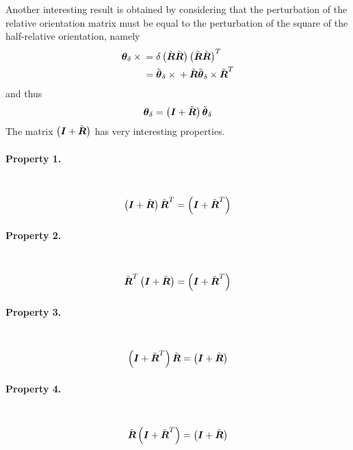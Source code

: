 \documentclass[10pt,dvips,fleqn]{report}
\newcommand{\T}[1]{\boldsymbol{#1}}
\begin{document}
Another interesting result is obtained by considering that
the perturbation of the relative orientation matrix
must be equal to the perturbation of the square 
of the half-relative orientation, namely
\begin{align}
	\T{\theta}_{\delta} \times{}
	&= \delta\plbr{\tilde{\T{R}}\tilde{\T{R}}} \plbr{\tilde{\T{R}}\tilde{\T{R}}}^T \\
	&= \tilde{\T{\theta}}_{\delta} \times{} + \tilde{\T{R}} \tilde{\T{\theta}}_{\delta} \times \tilde{\T{R}}^T
\end{align}
and thus
\begin{equation}
	\T{\theta}_{\delta} = \plbr{\T{I} + \tilde{\T{R}}} \tilde{\T{\theta}}_{\delta}
	\label{eq:inv-def-h-theta-delta-tilde}
\end{equation}
The matrix $\plbr{\T{I} + \tilde{\T{R}}}$ has very interesting properties.

\paragraph{Property 1.} \
\begin{equation}
	\plbr{\T{I} + \tilde{\T{R}}} \tilde{\T{R}}^T = \plbr{\T{I} + \tilde{\T{R}}^T}
	\label{eq:inv-def-h-property-1}
\end{equation}

\paragraph{Property 2.} \
\begin{equation}
	\tilde{\T{R}}^T \plbr{\T{I} + \tilde{\T{R}}} = \plbr{\T{I} + \tilde{\T{R}}^T}
	\label{eq:inv-def-h-property-2}
\end{equation}

\paragraph{Property 3.} \
\begin{equation}
	\plbr{\T{I} + \tilde{\T{R}}^T} \tilde{\T{R}} = \plbr{\T{I} + \tilde{\T{R}}}
	\label{eq:inv-def-h-property-3}
\end{equation}

\paragraph{Property 4.} \
\begin{equation}
	\tilde{\T{R}} \plbr{\T{I} + \tilde{\T{R}}^T} = \plbr{\T{I} + \tilde{\T{R}}}
	\label{eq:inv-def-h-property-4}
\end{equation}
\end{document}
